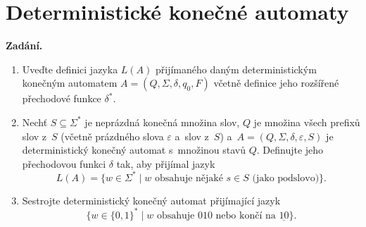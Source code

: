 \section{Deterministické konečné automaty}

\noindent\textbf{Zadání.}\par
\begin{enumerate}
\item Uveďte definici jazyka $L(A)$ přijímaného daným deterministickým konečným
  automatem $A = (Q, \Sigma, \delta, q_0, F)$ včetně definice jeho rozšířené přechodové
  funkce $\delta^*$.
\item Nechť $S \subseteq \Sigma^*$ je neprázdná konečná množina slov, $Q$ je množina
  všech prefixů slov z~$S$ (včetně prázdného slova $\varepsilon$ a~slov z~$S$)
  a~$A = (Q, \Sigma, \delta, \varepsilon, S)$ je deterministický konečný automat
  s~množinou stavů $Q$. Definujte jeho přechodovou funkci $\delta$ tak, aby přijímal
  jazyk
  \[ L(A) = \{w \in \Sigma^* \mid w \text{ obsahuje nějaké } s \in S \text{ (jako podslovo)}\}. \]
\item Sestrojte deterministický konečný automat přijímající jazyk
  \[ \{w \in \{0,1\}^* \mid w \text{ obsahuje } 010 \text{ nebo končí na } \underline{10}\}. \]
\end{enumerate}

